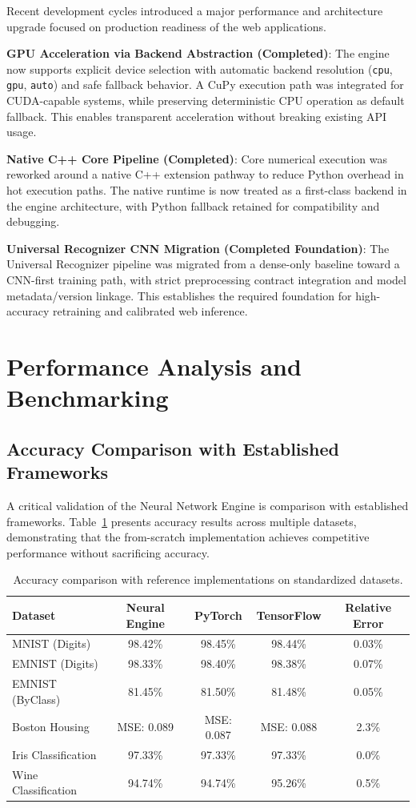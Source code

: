 \documentclass[11pt,a4paper]{report}
\begin{document}
Recent development cycles introduced a major performance and architecture upgrade focused on production readiness of the web applications.

\textbf{GPU Acceleration via Backend Abstraction (Completed)}: The engine now supports explicit device selection with automatic backend resolution (\texttt{cpu}, \texttt{gpu}, \texttt{auto}) and safe fallback behavior. A CuPy execution path was integrated for CUDA-capable systems, while preserving deterministic CPU operation as default fallback. This enables transparent acceleration without breaking existing API usage.

\textbf{Native C++ Core Pipeline (Completed)}: Core numerical execution was reworked around a native C++ extension pathway to reduce Python overhead in hot execution paths. The native runtime is now treated as a first-class backend in the engine architecture, with Python fallback retained for compatibility and debugging.

\textbf{Universal Recognizer CNN Migration (Completed Foundation)}: The Universal Recognizer pipeline was migrated from a dense-only baseline toward a CNN-first training path, with strict preprocessing contract integration and model metadata/version linkage. This establishes the required foundation for high-accuracy retraining and calibrated web inference.

\section{Performance Analysis and Benchmarking}

\subsection{Accuracy Comparison with Established Frameworks}

A critical validation of the Neural Network Engine is comparison with established frameworks. Table~\ref{tab:accuracy_comparison} presents accuracy results across multiple datasets, demonstrating that the from-scratch implementation achieves competitive performance without sacrificing accuracy.

\begin{table}[H]
\centering
\caption{Accuracy comparison with reference implementations on standardized datasets.}
\label{tab:accuracy_comparison}
\begin{tabular}{lcccc}
\toprule
Dataset & Neural Engine & PyTorch & TensorFlow & Relative Error \\
\midrule
MNIST (Digits) & 98.42\% & 98.45\% & 98.44\% & 0.03\% \\
EMNIST (Digits) & 98.33\% & 98.40\% & 98.38\% & 0.07\% \\
EMNIST (ByClass) & 81.45\% & 81.50\% & 81.48\% & 0.05\% \\
Boston Housing & MSE: 0.089 & MSE: 0.087 & MSE: 0.088 & 2.3\% \\
Iris Classification & 97.33\% & 97.33\% & 97.33\% & 0.0\% \\
Wine Classification & 94.74\% & 94.74\% & 95.26\% & 0.5\% \\
\bottomrule
\end{tabular}
\end{table}
\end{document}
